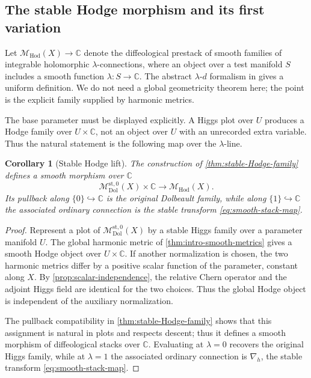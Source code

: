 \documentclass[11pt,reqno]{amsart}
\newtheorem{corollary}[theorem]{Corollary}
\theoremstyle{definition}
\theoremstyle{remark}
\newcommand{\C}{\mathbb C}
\newcommand{\Dol}{\mathrm{Dol}}
\newcommand{\Hod}{\mathrm{Hod}}
\newcommand{\st}{\mathrm{st}}
\newcommand{\MdiffDol}{\mathscr M_{\Dol}}
\newcommand{\MdiffHod}{\mathscr M_{\Hod}}
\begin{document}
\subsection{The stable Hodge morphism and its first variation}

Let $\MdiffHod(X)\to\C$ denote the diffeological prestack of smooth families of integrable holomorphic $\lambda$-connections, where an object over a test manifold $S$ includes a smooth function $\lambda:S\to\C$.  The abstract $\lambda$-$d$ formalism in \cite{AzamRayan2026} gives a uniform definition.  We do not need a global geometricity theorem here; the point is the explicit family supplied by harmonic metrics.

The base parameter must be displayed explicitly.  A Higgs plot over $U$ produces a Hodge family over $U\times\C$, not an object over $U$ with an unrecorded extra variable.  Thus the natural statement is the following map over the $\lambda$-line.

\begin{corollary}[Stable Hodge lift]\label{cor:stable-Hodge-lift}
The construction of \cref{thm:stable-Hodge-family} defines a smooth morphism over $\C$
\[
  \MdiffDol^{\st,0}(X)\times\C
  \longrightarrow
  \MdiffHod(X).
\]
Its pullback along $\{0\}\hookrightarrow\C$ is the original Dolbeault family, while along $\{1\}\hookrightarrow\C$ the associated ordinary connection is the stable transform \eqref{eq:smooth-stack-map}.
\end{corollary}

\begin{proof}
Represent a plot of $\MdiffDol^{\st,0}(X)$ by a stable Higgs family over a parameter manifold $U$.  The global harmonic metric of \cref{thm:intro-smooth-metrics} gives a smooth Hodge object over $U\times\C$.  If another normalization is chosen, the two harmonic metrics differ by a positive scalar function of the parameter, constant along $X$.  By \cref{prop:scalar-independence}, the relative Chern operator and the adjoint Higgs field are identical for the two choices.  Thus the global Hodge object is independent of the auxiliary normalization.

The pullback compatibility in \cref{thm:stable-Hodge-family} shows that this assignment is natural in plots and respects descent; thus it defines a smooth morphism of diffeological stacks over $\C$.  Evaluating at $\lambda=0$ recovers the original Higgs family, while at $\lambda=1$ the associated ordinary connection is $\nabla_h$, the stable transform \eqref{eq:smooth-stack-map}.
\end{proof}
\end{document}
